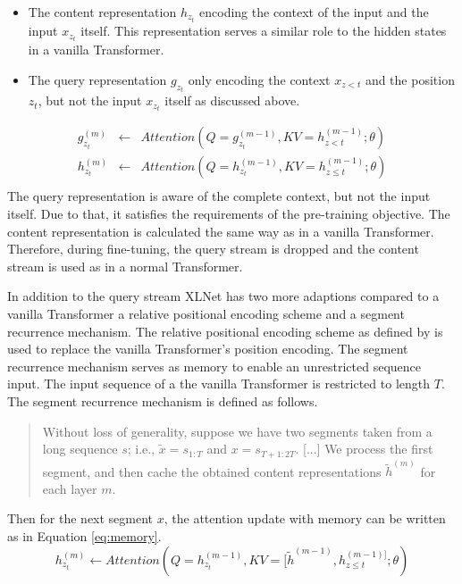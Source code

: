 \begin{itemize}
	\item  The content representation $h_{z_t}$ encoding the context of the input and the input $x_{z_t}$ itself. This representation serves a similar role to the  hidden states in a vanilla Transformer.
	\item The query representation $g_{z_t}$ only encoding the context $x_{z < t}$ and the position $z_t$, but not the input $x_{z_t}$ itself as discussed above. 
\end{itemize}
\begin{equation}
\label{eq:xlnet}
	\begin{array}{lcr}
		g_{z_t}^{(m)} & \gets & Attention(Q=g_{z_t}^{(m-1)},KV=h_{z < t}^{(m-1)}; \theta)\\
		h_{z_t}^{(m)} & \gets & Attention(Q=h_{z_t}^{(m-1)},KV=h_{z \le t}^{(m-1)}; \theta)\\
	\end{array}
\end{equation}
The query representation is aware of the complete context, but not the input itself. Due to that, it satisfies the requirements of the pre-training objective. The content representation is calculated the same way as in a vanilla Transformer. Therefore, during fine-tuning, the query stream is dropped and the content stream is used as in a normal Transformer.\autocite{Yang.2019}
\par
In addition to the query stream XLNet has two more adaptions compared to a vanilla Transformer a relative positional encoding scheme and a segment recurrence mechanism. The relative positional encoding scheme as defined by \cite{Dai.2019} is used to replace the vanilla Transformer's position encoding. The segment recurrence mechanism serves as memory to enable an unrestricted sequence input. The input sequence of a the vanilla Transformer is restricted to length $T$. The segment recurrence mechanism is defined as follows. \blockcquote{Yang.2019}{Without loss of generality, suppose we have two segments taken from a long sequence $s$; i.e., $\tilde{x} = s_{1:T}$  and $x = s_{T+1:2T}$. [...] We process the first segment, and then cache the obtained content representations $\tilde{h}^{(m)}$ for each layer $m$.} Then for the next segment $x$, the attention update with memory can be written as in Equation \eqref{eq:memory}.\autocite{Yang.2019}
\begin{equation}
	\label{eq:memory}
	h_{z_t}^{(m)} \gets Attention(Q=h_{z_t}^{(m-1)},KV=[\tilde{h}^{(m-1)}, h_{z \le t}^{(m-1)]}; \theta)
\end{equation}
